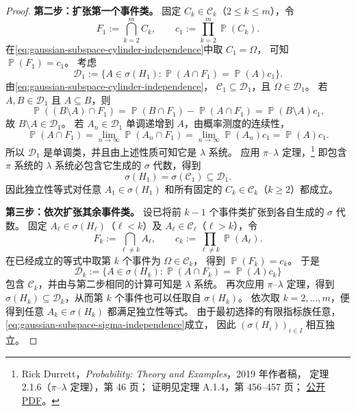 \documentclass[UTF8,11pt,a4paper,oneside,fontset=fandol]{ctexrep}
\numberwithin{equation}{section}
\theoremstyle{plain}
\theoremstyle{definition}
\theoremstyle{remark}
\DeclareMathOperator{\Prob}{\mathbb{P}}
\begin{document}
\begin{proof}
\textbf{第二步：扩张第一个事件类。}
固定 $C_k\in\mathcal C_k$（$2\le k\le m$），令
\[
  F_1:=\bigcap_{k=2}^{m}C_k,
  \qquad c_1:=\prod_{k=2}^{m}\Prob(C_k).
\]
在\cref{eq:gaussian-subspace-cylinder-independence}中取 $C_1=\Omega$，
可知 $\Prob(F_1)=c_1$。
考虑
\[
  \mathcal D_1
  :=\{A\in\sigma(H_1):\Prob(A\cap F_1)=\Prob(A)c_1\}.
\]
由\cref{eq:gaussian-subspace-cylinder-independence}，
$\mathcal C_1\subseteq\mathcal D_1$，且 $\Omega\in\mathcal D_1$。
若 $A,B\in\mathcal D_1$ 且 $A\subseteq B$，则
\[
  \Prob((B\setminus A)\cap F_1)
  =\Prob(B\cap F_1)-\Prob(A\cap F_1)
  =\Prob(B\setminus A)c_1,
\]
故 $B\setminus A\in\mathcal D_1$。
若 $A_n\in\mathcal D_1$ 单调递增到 $A$，由概率测度的连续性，
\[
  \Prob(A\cap F_1)
  =\lim_{n\to\infty}\Prob(A_n\cap F_1)
  =\lim_{n\to\infty}\Prob(A_n)c_1
  =\Prob(A)c_1.
\]
所以 $\mathcal D_1$ 是单调类，并且由上述性质可知它是 $\lambda$ 系统。
应用 $\pi$--$\lambda$ 定理，\footnote{%
Rick Durrett，\emph{Probability: Theory and Examples}，2019 年作者稿，
定理 2.1.6（$\pi$--$\lambda$ 定理），第 46 页；
证明见定理 A.1.4，第 456--457 页；
\href{https://sites.math.duke.edu/~rtd/PTE/PTE5_011119.pdf}{公开 PDF}。}
即包含 $\pi$ 系统的 $\lambda$ 系统必包含它生成的 $\sigma$ 代数，得到
\[
  \sigma(H_1)=\sigma(\mathcal C_1)\subseteq\mathcal D_1.
\]
因此独立性等式对任意 $A_1\in\sigma(H_1)$ 和所有固定的
$C_k\in\mathcal C_k$（$k\ge2$）都成立。

\textbf{第三步：依次扩张其余事件类。}
设已将前 $k-1$ 个事件类扩张到各自生成的 $\sigma$ 代数。
固定 $A_\ell\in\sigma(H_\ell)$（$\ell<k$）及
$A_\ell\in\mathcal C_\ell$（$\ell>k$），令
\[
  F_k:=\bigcap_{\ell\ne k}A_\ell,
  \qquad c_k:=\prod_{\ell\ne k}\Prob(A_\ell).
\]
在已经成立的等式中取第 $k$ 个事件为 $\Omega\in\mathcal C_k$，
得到 $\Prob(F_k)=c_k$。
于是
\[
  \mathcal D_k
  :=\{A\in\sigma(H_k):\Prob(A\cap F_k)=\Prob(A)c_k\}
\]
包含 $\mathcal C_k$，并由与第二步相同的计算可知是 $\lambda$ 系统。
再次应用 $\pi$--$\lambda$ 定理，得到
$\sigma(H_k)\subseteq\mathcal D_k$，从而第 $k$ 个事件也可以任取自
$\sigma(H_k)$。
依次取 $k=2,\ldots,m$，便得到任意 $A_k\in\sigma(H_k)$ 都满足独立性等式。
由于最初选择的有限指标族任意，\cref{eq:gaussian-subspace-sigma-independence}成立，
因此 $(\sigma(H_i))_{i\in I}$ 相互独立。
\end{proof}
\end{document}
